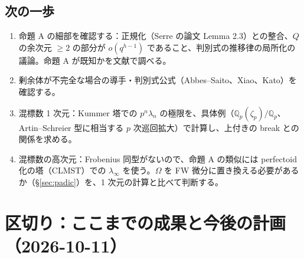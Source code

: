 \documentclass[11pt,a4paper]{ltjsarticle}
\theoremstyle{plain}
\theoremstyle{definition}
\theoremstyle{remark}
\theoremstyle{plain}
\begin{document}
\subsection{次の一歩}
\begin{enumerate}
  \item 命題 A の細部を確認する：正規化（Serre の論文 Lemma 2.3）との整合、$Q$ の余次元 $\ge2$ の部分が $o(q^{h-1})$ であること、判別式の推移律の局所化の議論。命題 A が既知かを文献で調べる。
  \item 剰余体が不完全な場合の導手・判別式公式（Abbes--Saito、Xiao、Kato）を確認する。
  \item 混標数 1 次元：Kummer 塔での $p^n\lambda_n$ の極限を、具体例（$\mathbb{Q}_p(\zeta_p)/\mathbb{Q}_p$、Artin--Schreier 型に相当する $p$ 次巡回拡大）で計算し、上付きの break との関係を求める。
  \item 混標数の高次元：Frobenius 同型がないので、命題 A の類似には perfectoid 化の塔（CLMST）での $\lambda_\infty$ を使う。$\Omega$ を FW 微分に置き換える必要があるか（\S\ref{sec:padic}）を、1 次元の計算と比べて判断する。
\end{enumerate}

\section{区切り：ここまでの成果と今後の計画（2026-10-11）}\label{sec:plan}
\end{document}
